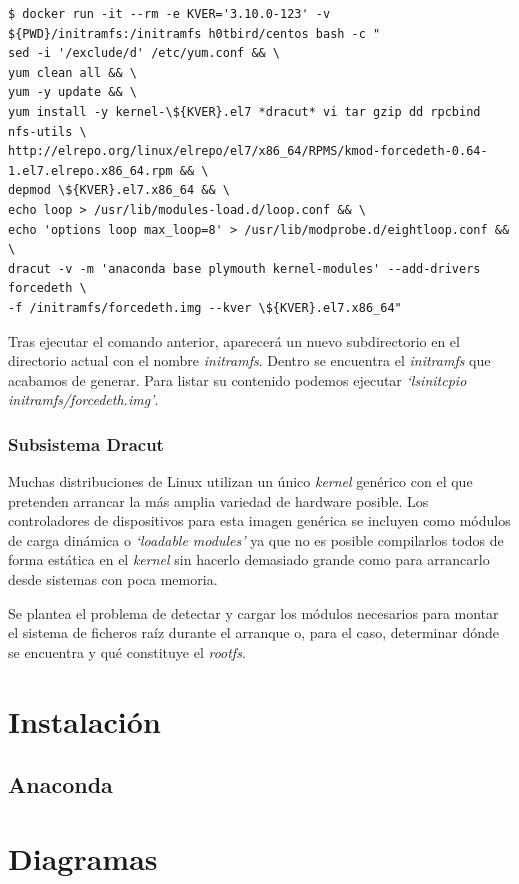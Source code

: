 \documentclass[a4paper,12pt,spanish,final]{epsc_tfc_pfc}
\begin{document}
\begin{lstlisting}[style=dnsmasq]
$ docker run -it --rm -e KVER='3.10.0-123' -v ${PWD}/initramfs:/initramfs h0tbird/centos bash -c "
sed -i '/exclude/d' /etc/yum.conf && \
yum clean all && \
yum -y update && \
yum install -y kernel-\${KVER}.el7 *dracut* vi tar gzip dd rpcbind nfs-utils \
http://elrepo.org/linux/elrepo/el7/x86_64/RPMS/kmod-forcedeth-0.64-1.el7.elrepo.x86_64.rpm && \
depmod \${KVER}.el7.x86_64 && \
echo loop > /usr/lib/modules-load.d/loop.conf && \
echo 'options loop max_loop=8' > /usr/lib/modprobe.d/eightloop.conf && \
dracut -v -m 'anaconda base plymouth kernel-modules' --add-drivers forcedeth \
-f /initramfs/forcedeth.img --kver \${KVER}.el7.x86_64"
\end{lstlisting}

Tras ejecutar el comando anterior, aparecerá un nuevo subdirectorio en el directorio actual con el nombre \emph{initramfs}. Dentro se encuentra el \emph{initramfs} que acabamos de generar. Para listar su contenido podemos ejecutar \emph{`lsinitcpio initramfs/forcedeth.img'}.

\subsubsection{Subsistema Dracut}
Muchas distribuciones de Linux utilizan un único \emph{kernel} genérico con el que pretenden arrancar la más amplia variedad de hardware posible.
Los controladores de dispositivos para esta imagen genérica se incluyen como módulos de carga dinámica o \emph{`loadable modules'} ya que no es posible compilarlos todos de forma estática en el \emph{kernel} sin hacerlo demasiado grande como para arrancarlo desde sistemas con poca memoria.

Se plantea el problema de detectar y cargar los módulos necesarios para montar el sistema de ficheros raíz durante el arranque o, para el caso, determinar dónde se encuentra y qué constituye el \emph{rootfs}.
\section{Instalación}

\subsection{Anaconda}

\section{Diagramas}
\end{document}

